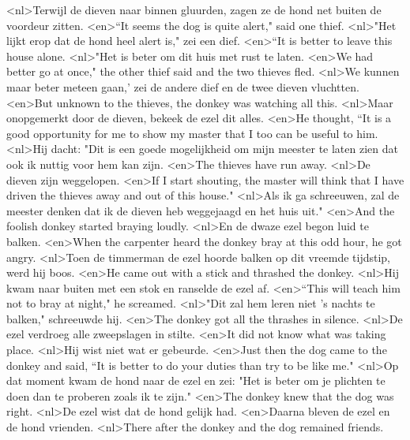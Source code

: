 <nl>Terwijl de dieven naar binnen gluurden, zagen ze de hond net buiten de voordeur zitten.
<en>“It seems the dog is quite alert," said one thief.
<nl>"Het lijkt erop dat de hond heel alert is," zei een dief.
<en>“It is better to leave this house alone.
<nl>"Het is beter om dit huis met rust te laten.
<en>We had better go at once," the other thief said and the two thieves fled.
<nl>We kunnen maar beter meteen gaan,' zei de andere dief en de twee dieven vluchtten.
<en>But unknown to the thieves, the donkey was watching all this.
<nl>Maar onopgemerkt door de dieven, bekeek de ezel dit alles.
<en>He thought, “It is a good opportunity for me to show my master that I too can be useful to him.
<nl>Hij dacht: "Dit is een goede mogelijkheid om mijn meester te laten zien dat ook ik nuttig voor hem kan zijn.
<en>The thieves have run away.
<nl>De dieven zijn weggelopen.
<en>If I start shouting, the master will think that I have driven the thieves away and out of this house."
<nl>Als ik ga schreeuwen, zal de meester denken dat ik de dieven heb weggejaagd en het huis uit."
<en>And the foolish donkey started braying loudly.
<nl>En de dwaze ezel begon luid te balken.
<en>When the carpenter heard the donkey bray at this odd hour, he got angry.
<nl>Toen de timmerman  de ezel  hoorde balken op dit vreemde tijdstip, werd hij boos.
<en>He came out with a stick and thrashed the donkey.
<nl>Hij kwam naar buiten met een stok en ranselde de ezel af.
<en>“This will teach him not to bray at night," he screamed.
<nl>"Dit zal hem leren niet 's nachts te balken," schreeuwde hij.
<en>The donkey got all the thrashes in silence.
<nl>De ezel verdroeg alle zweepslagen in stilte.
<en>It did not know what was taking place.
<nl>Hij wist niet wat er gebeurde.
<en>Just then the dog came to the donkey and said, “It is better to do your duties than try to be like me."
<nl>Op dat moment kwam de hond naar de ezel en zei: "Het is beter om je plichten te doen dan te proberen zoals ik te zijn."
<en>The donkey knew that the dog was right. 
<nl>De ezel wist dat de hond gelijk had. 
<en>Daarna bleven de ezel en de hond vrienden.
<nl>There after  the donkey and the dog remained friends.
